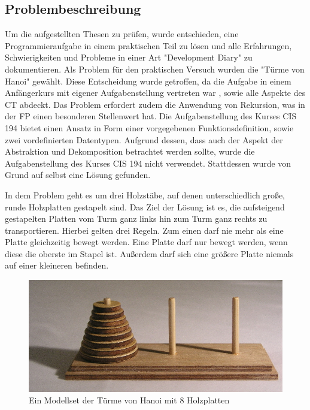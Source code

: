 \subsection{Problembeschreibung}\label{sec:problemdesc}
Um die aufgestellten Thesen zu prüfen, wurde entschieden, eine Programmieraufgabe in einem praktischen Teil zu lösen und alle Erfahrungen, Schwierigkeiten und Probleme in einer Art "Development Diary" zu dokumentieren.
Als Problem für den praktischen Versuch wurden die "Türme von Hanoi" gewählt. Diese Entscheidung wurde getroffen, da die Aufgabe in einem Anfängerkurs mit eigener Aufgabenstellung vertreten war \cite{cis194}, sowie alle Aspekte des CT abdeckt. Das Problem erfordert zudem die Anwendung von Rekursion, was in der FP einen besonderen Stellenwert hat.
Die Aufgabenstellung des Kurses CIS 194 bietet einen Ansatz in Form einer vorgegebenen Funktionsdefinition, sowie zwei vordefinierten Datentypen. Aufgrund dessen, dass auch der Aspekt der Abstraktion und Dekomposition betrachtet werden sollte, wurde die Aufgabenstellung des Kurses CIS 194 nicht verwendet. Stattdessen wurde von Grund auf selbst eine Lösung gefunden.

In dem Problem geht es um drei Holzstäbe, auf denen unterschiedlich große, runde Holzplatten gestapelt sind. Das Ziel der Lösung ist es, die aufsteigend gestapelten Platten vom Turm ganz links hin zum Turm ganz rechts zu transportieren. Hierbei gelten drei Regeln. Zum einen darf nie mehr als eine Platte gleichzeitig bewegt werden. Eine Platte darf nur bewegt werden, wenn diese die oberste im Stapel ist. Außerdem darf sich eine größere Platte niemals auf einer kleineren befinden.

\begin{figure}[H]
    \centering
    \includegraphics[width=1\linewidth]{Figures/Section_4/hanoi}
    \caption{Ein Modellset der Türme von Hanoi mit 8 Holzplatten \protect\cite{wikicommons}}
\end{figure}

